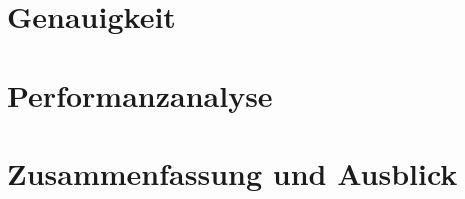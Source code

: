 \documentclass[course=erap]{aspdoc}
\begin{document}
\section{Genauigkeit}


\section{Performanzanalyse}


\section{Zusammenfassung und Ausblick}


{}
\end{document}

